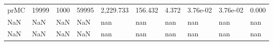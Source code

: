 \begin{tabular}{llllllllll}
prMC &  19999 &       1000 &       59995 & 2,229.733 &                      156.432 &          4.372 &         3.76e-02 &        3.76e-02 &        0.000 \\
 NaN &    NaN &        NaN &         NaN &       nan &                          nan &            nan &              nan &             nan &          nan \\
 NaN &    NaN &        NaN &         NaN &       nan &                          nan &            nan &              nan &             nan &          nan \\
\bottomrule
\end{tabular}
